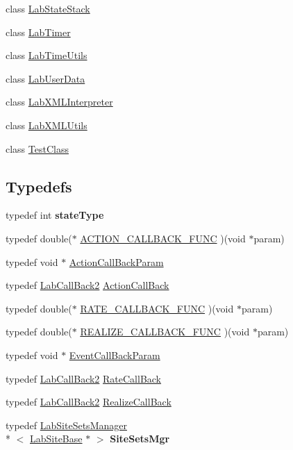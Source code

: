 \begin{DoxyCompactItemize}
\item 
class \hyperlink{classelps_1_1_lab_state_stack}{Lab\+State\+Stack}
\item 
class \hyperlink{classelps_1_1_lab_timer}{Lab\+Timer}
\item 
class \hyperlink{classelps_1_1_lab_time_utils}{Lab\+Time\+Utils}
\item 
class \hyperlink{classelps_1_1_lab_user_data}{Lab\+User\+Data}
\item 
class \hyperlink{classelps_1_1_lab_x_m_l_interpreter}{Lab\+X\+M\+L\+Interpreter}
\item 
class \hyperlink{classelps_1_1_lab_x_m_l_utils}{Lab\+X\+M\+L\+Utils}
\item 
class \hyperlink{classelps_1_1_test_class}{Test\+Class}
\end{DoxyCompactItemize}
\subsection*{Typedefs}
\begin{DoxyCompactItemize}
\item 
\hypertarget{namespaceelps_a63521489c3e71833c80f11312f28e37b}{typedef int {\bfseries state\+Type}}\label{namespaceelps_a63521489c3e71833c80f11312f28e37b}

\item 
typedef double($\ast$ \hyperlink{namespaceelps_a61544f8fd8d17655cb55e58582a8a503}{A\+C\+T\+I\+O\+N\+\_\+\+C\+A\+L\+L\+B\+A\+C\+K\+\_\+\+F\+U\+N\+C} )(void $\ast$param)
\item 
typedef void $\ast$ \hyperlink{namespaceelps_a25715773cecbf210efb08dff37b7b013}{Action\+Call\+Back\+Param}
\item 
typedef \hyperlink{classelps_1_1_lab_call_back2}{Lab\+Call\+Back2} \hyperlink{namespaceelps_aa1ee9bc57556d61c2b7534818c6d5889}{Action\+Call\+Back}
\item 
typedef double($\ast$ \hyperlink{namespaceelps_a63a7933a53bef835381f77e30068cd60}{R\+A\+T\+E\+\_\+\+C\+A\+L\+L\+B\+A\+C\+K\+\_\+\+F\+U\+N\+C} )(void $\ast$param)
\item 
typedef double($\ast$ \hyperlink{namespaceelps_a3f8f7ce6643b1498f3ae0f6b09c2f1fc}{R\+E\+A\+L\+I\+Z\+E\+\_\+\+C\+A\+L\+L\+B\+A\+C\+K\+\_\+\+F\+U\+N\+C} )(void $\ast$param)
\item 
typedef void $\ast$ \hyperlink{namespaceelps_a1bd4230d698fa66dd38f0fc1cc5c2c55}{Event\+Call\+Back\+Param}
\item 
typedef \hyperlink{classelps_1_1_lab_call_back2}{Lab\+Call\+Back2} \hyperlink{namespaceelps_a121bfb217e5fbb734b95d3f7b6653fb2}{Rate\+Call\+Back}
\item 
typedef \hyperlink{classelps_1_1_lab_call_back2}{Lab\+Call\+Back2} \hyperlink{namespaceelps_adb49d5dbf827d9b190d0b1fd15e0193c}{Realize\+Call\+Back}
\item 
\hypertarget{namespaceelps_aa00d9c3a631dd42cb51834b2d82df4e6}{typedef \hyperlink{classelps_1_1_lab_site_sets_manager}{Lab\+Site\+Sets\+Manager}\\*
$<$ \hyperlink{classelps_1_1_lab_site_base}{Lab\+Site\+Base} $\ast$ $>$ {\bfseries Site\+Sets\+Mgr}}\label{namespaceelps_aa00d9c3a631dd42cb51834b2d82df4e6}

\end{DoxyCompactItemize}
